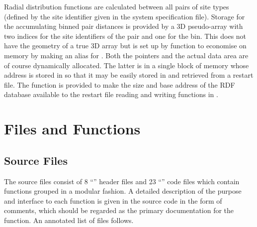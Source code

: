 \documentclass[a4paper,twoside]{report}
\begin{document}
Radial distribution functions are calculated between all pairs of site
types (defined by the site identifier given in the system
specification file).  Storage for the accumulating binned pair
distances is provided by a 3D pseudo-array 
with two indices for the site identifiers of the pair and one for the
bin.  This does not have the geometry of a true 3D array but is set up
by function  to economise on memory by making
 an alias for .
Both the pointers and the actual data area are of course dynamically
allocated.  The latter is in a single block of memory whose address is
stored in  so that it may be easily stored in and
retrieved from a restart file.  The function  is
provided to make the size and base address of the RDF database
available to the restart file reading and writing functions in
.


\section{Files and Functions}%

\subsection{Source Files}
The source files consist of 8 ``'' header files and 23
``'' code files which contain functions grouped in a modular
fashion.  A detailed description of the purpose and interface to each
function is given in the source code in the form of comments, which
should be regarded as the primary documentation for the function.  An
annotated list of files follows.
\end{document}
